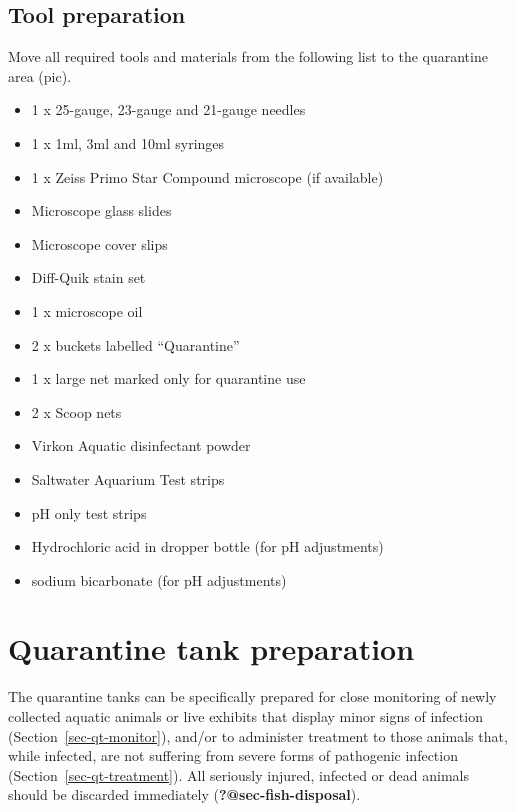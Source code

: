 \documentclass[
  letterpaper,
  DIV=11,
  numbers=noendperiod]{scrreprt}
\providecommand{\tightlist}{%
  \setlength{\itemsep}{0pt}\setlength{\parskip}{0pt}}\usepackage{longtable,booktabs,array}
\begin{document}
\hypertarget{sec-quarantine-tool}{%
\subsection{Tool preparation}\label{sec-quarantine-tool}}

Move all required tools and materials from the following list to the
quarantine area (pic).

\begin{itemize}
\tightlist
\item
  1 x 25-gauge, 23-gauge and 21-gauge needles
\item
  1 x 1ml, 3ml and 10ml syringes
\item
  1 x Zeiss Primo Star Compound microscope (if available)
\item
  Microscope glass slides
\item
  Microscope cover slips
\item
  Diff-Quik stain set
\item
  1 x microscope oil
\item
  2 x buckets labelled ``Quarantine''
\item
  1 x large net marked only for quarantine use
\item
  2 x Scoop nets
\item
  Virkon Aquatic disinfectant powder
\item
  Saltwater Aquarium Test strips
\item
  pH only test strips
\item
  Hydrochloric acid in dropper bottle (for pH adjustments)
\item
  sodium bicarbonate (for pH adjustments)
\end{itemize}

\hypertarget{sec-qt-prep}{%
\section{Quarantine tank preparation}\label{sec-qt-prep}}

The quarantine tanks can be specifically prepared for close monitoring
of newly collected aquatic animals or live exhibits that display minor
signs of infection (Section~\ref{sec-qt-monitor}), and/or to administer
treatment to those animals that, while infected, are not suffering from
severe forms of pathogenic infection (Section~\ref{sec-qt-treatment}).
All seriously injured, infected or dead animals should be discarded
immediately (\textbf{?@sec-fish-disposal}).
\end{document}
